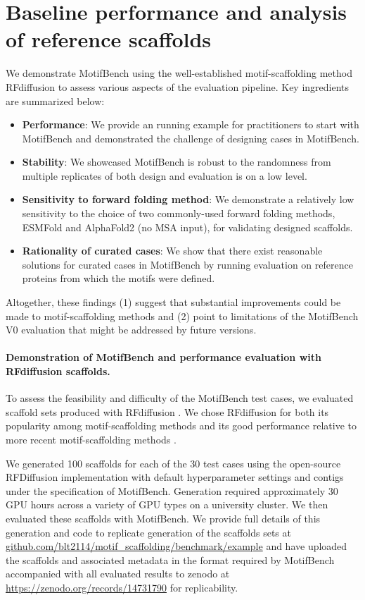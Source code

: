 \section{Baseline performance and analysis of reference scaffolds}
\label{section:baseline_section}
We demonstrate MotifBench using the well-established motif-scaffolding method RFdiffusion \citep{watson2022broadly} to assess various aspects of the evaluation pipeline. Key ingredients are summarized below:
\begin{itemize}
    \item \textbf{Performance}: We provide an running example for practitioners to start with MotifBench and demonstrated the challenge of designing cases in MotifBench.
    \item \textbf{Stability}: We showcased MotifBench is robust to the randomness from multiple replicates of both design and evaluation is on a low level.
    \item \textbf{Sensitivity to forward folding method}: We demonstrate a relatively low sensitivity to the choice of two commonly-used forward folding methods, ESMFold and AlphaFold2 (no MSA input), for validating designed scaffolds.
    \item \textbf{Rationality of curated cases}: We show that there exist reasonable solutions for curated cases in MotifBench by running evaluation on reference proteins from which the motifs were defined.
\end{itemize}

Altogether, these findings (1) suggest that substantial improvements could be made to motif-scaffolding methods and (2) point to limitations of the MotifBench V0 evaluation that might be addressed by future versions.

\paragraph{Demonstration of MotifBench and performance evaluation with RFdiffusion scaffolds.}

To assess the feasibility and difficulty of the MotifBench test cases, we evaluated scaffold sets produced with RFdiffusion \citep{watson2022broadly}. We chose RFdiffusion for both its popularity among motif-scaffolding methods and its good performance relative to more recent motif-scaffolding methods \citep[see e.g.][]{wu2024practical,lin2024out,yim2024improved}.

We generated 100 scaffolds for each of the 30 test cases using the open-source RFDiffusion implementation with default hyperparameter settings and contigs under the specification of MotifBench.  Generation required approximately 30 GPU hours across a variety of GPU types on a university cluster. We then evaluated these scaffolds with MotifBench. We provide full details of this generation and code to replicate generation of the scaffolds sets at \url{github.com/blt2114/motif_scaffolding/benchmark/example} and have uploaded the scaffolds and associated metadata in the format required by MotifBench accompanied with all evaluated results to zenodo at \url{https://zenodo.org/records/14731790} for replicability.

